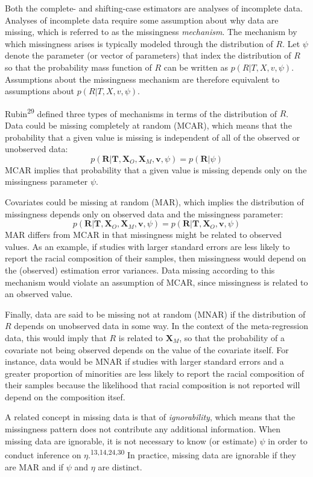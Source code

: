 \documentclass[
]{article}
\begin{document}
Both the complete- and shifting-case estimators are analyses of incomplete data.
Analyses of incomplete data require some assumption about why data are missing, which is referred to as the missingness \emph{mechanism}.
The mechanism by which missingness arises is typically modeled through the distribution of \(R\).
Let \(\psi\) denote the parameter (or vector of parameters) that index the distribution of \(R\) so that the probability mass function of \(R\) can be written as \(p(R | T, X, v, \psi)\).
Assumptions about the missingness mechanism are therefore equivalent to assumptions about \(p(R | T, X, v, \psi)\).

Rubin\textsuperscript{29} defined three types of mechanisms in terms of the distribution of \(R\).
Data could be missing completely at random (MCAR), which means that the probability that a given value is missing is independent of all of the observed or unobserved data:
\[
  p(\mathbf{R} | \mathbf{T}, \mathbf{X}_O, \mathbf{X}_M, \mathbf{v}, \psi) = p(\mathbf{R} | \psi)
\]
MCAR implies that probability that a given value is missing depends only on the missingness parameter \(\psi\).

Covariates could be missing at random (MAR), which implies the distribution of missingness depends only on observed data and the missingness parameter:
\[
  p(\mathbf{R} | \mathbf{T}, \mathbf{X}_O, \mathbf{X}_M, \mathbf{v}, \psi) = 
  p(\mathbf{R} | \mathbf{T}, \mathbf{X}_O,\mathbf{v}, \psi)
\]
MAR differs from MCAR in that missingness might be related to observed values.
As an example, if studies with larger standard errors are less likely to report the racial composition of their samples, then missingness would depend on the (observed) estimation error variances.
Data missing according to this mechanism would violate an assumption of MCAR, since missingness is related to an observed value.

Finally, data are said to be missing not at random (MNAR) if the distribution of \(R\) depends on unobserved data in some way.
In the context of the meta-regression data, this would imply that \(R\) is related to \(\mathbf{X}_M\), so that the probability of a covariate not being observed depends on the value of the covariate itself.
For instance, data would be MNAR if studies with larger standard errors and a greater proportion of minorities are less likely to report the racial composition of their samples because the likelihood that racial composition is not reported will depend on the composition itsef.

A related concept in missing data is that of \emph{ignorability}, which means that the missingness pattern does not contribute any additional information.
When missing data are ignorable, it is not necessary to know (or estimate) \(\psi\) in order to conduct inference on \(\eta\).\textsuperscript{13,14,24,30}
In practice, missing data are ignorable if they are MAR and if \(\psi\) and \(\eta\) are distinct.
\end{document}
